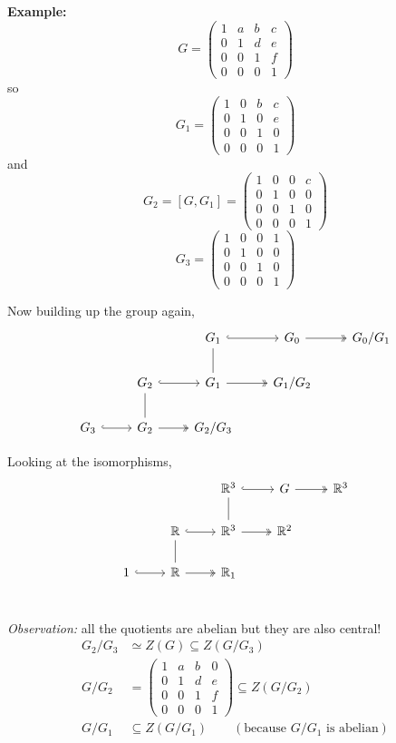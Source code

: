 \documentclass[12pt]{article}
\newcommand{\R}{\mathbb{R}}
\begin{document}
    \textbf{Example:} 
    \[G = \begin{pmatrix}
        1 & a & b & c\\ 
        0 & 1 & d & e\\ 
        0 & 0 & 1 & f\\ 
        0 & 0 & 0 & 1
    \end{pmatrix}\]
    so 
    \[G_1 = \begin{pmatrix}
        1 & 0 & b & c\\ 
        0 & 1 & 0 & e\\ 
        0 & 0 & 1 & 0\\ 
        0 & 0 & 0 & 1
    \end{pmatrix}\]
    and 
    \[G_2 = [G, G_1] = \begin{pmatrix}
        1 & 0 & 0 & c\\ 
        0 & 1 & 0 & 0\\ 
        0 & 0 & 1 & 0\\ 
        0 & 0 & 0 & 1
    \end{pmatrix}\]
    \[G_3 = \begin{pmatrix}
        1 & 0 & 0 & 1\\ 
        0 & 1 & 0 & 0\\ 
        0 & 0 & 1 & 0\\ 
        0 & 0 & 0 & 1
    \end{pmatrix}\]

    Now building up the group again, 
    \[\begin{tikzcd}
        & & G_1 \arrow[hook]{r} & G_0\arrow[two heads]{r} & G_0/G_1\\
        & G_2 \arrow[hook]{r} & G_1 \arrow[no head]{u} \arrow[two heads]{r} & G_1/G_2\\
        G_3 \arrow[hook]{r} & G_2 \arrow[no head]{u} \arrow[two heads]{r} & G_2/G_3
    \end{tikzcd}\]

    Looking at the isomorphisms, 
    \[\begin{tikzcd}
        & & \R^3 \arrow[hook]{r} & G \arrow[two heads]{r} & \R^3\\
        & \R \arrow[hook]{r} & \R^3 \arrow[no head]{u} \arrow[two heads]{r} & \R^2\\
        1 \arrow[hook]{r} & \R \arrow[no head]{u} \arrow[two heads]{r} & \R_1\\
    \end{tikzcd}\]

    \emph{Observation:} all the quotients are abelian but they are also central! 
    \begin{align*}
        G_2/G_3 &\simeq Z(G) \subseteq Z(G/G_3)\\ 
        G/G_2 &= \begin{pmatrix}
            1 & a & b & 0\\ 
            0 & 1 & d & e\\ 
            0 & 0 & 1 & f\\ 
            0 & 0 & 0 & 1
        \end{pmatrix} \subseteq Z(G/G_2)\\ 
        G/G_1 &\subseteq Z(G/G_1) \qquad (\text{because } G/G_1 \text{ is abelian})
    \end{align*}
\end{document}
